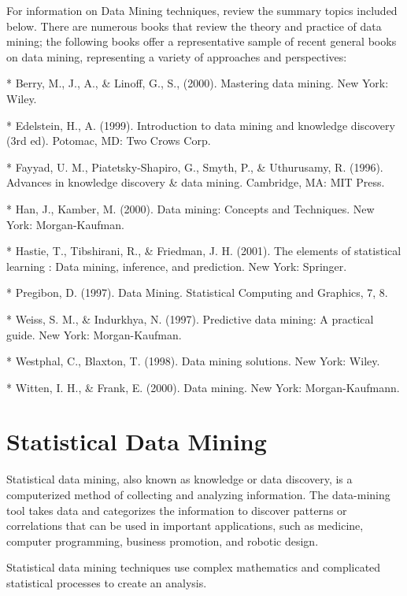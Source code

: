 \begin{description}
For information on Data Mining techniques, review the summary topics included below. There are numerous books that review the theory and practice of data mining; the following books offer a representative sample of recent general books on data mining, representing a variety of approaches and perspectives: 

\begin{enumerate}
*  Berry, M., J., A., \& Linoff, G., S., (2000). Mastering data mining. New York: Wiley.

*  Edelstein, H., A. (1999). Introduction to data mining and knowledge discovery (3rd ed). Potomac, MD: Two Crows Corp.

*  Fayyad, U. M., Piatetsky-Shapiro, G., Smyth, P., \& Uthurusamy, R. (1996). Advances in knowledge discovery \& data mining. Cambridge, MA: MIT Press.

*  Han, J., Kamber, M. (2000). Data mining: Concepts and Techniques. New York: Morgan-Kaufman.

*  Hastie, T., Tibshirani, R., \& Friedman, J. H. (2001). The elements of statistical learning : Data mining, inference, and prediction. New York: Springer.

* 
Pregibon, D. (1997). Data Mining. Statistical Computing and Graphics, 7, 8. 

*  
Weiss, S. M., \& Indurkhya, N. (1997). Predictive data mining: A practical guide. New York: Morgan-Kaufman.

* 
Westphal, C., Blaxton, T. (1998). Data mining solutions. New York: Wiley.

* 
Witten, I. H., \& Frank, E. (2000). Data mining. New York: Morgan-Kaufmann.
\end{enumerate}



\section{Statistical Data Mining}


Statistical data mining, also known as knowledge or data discovery, is a computerized method of collecting and analyzing information. The data-mining tool takes data and categorizes the information to discover patterns or correlations that can be used in important applications, such as medicine, computer programming, business promotion, and robotic design. 


Statistical data mining techniques use complex mathematics and complicated statistical processes to create an analysis.



\end{description}

